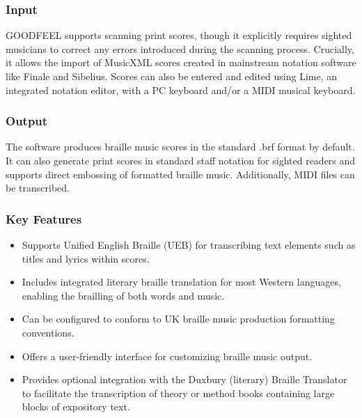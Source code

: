 \subsubsection{Input}
GOODFEEL supports scanning print scores, though it explicitly requires sighted musicians to correct any errors introduced during the scanning process. \cite{dancingdots-goodfeel} Crucially, it allows the import of MusicXML scores created in mainstream notation software like Finale and Sibelius. \cite{dancingdots-goodfeel} Scores can also be entered and edited using Lime, an integrated notation editor, with a PC keyboard and/or a MIDI musical keyboard. \cite{dancingdots-goodfeel, canasstech-limealoud, dancingdots-lime}

\subsubsection{Output}
The software produces braille music scores in the standard .brf format by default. \cite{dancingdots-goodfeel} It can also generate print scores in standard staff notation for sighted readers and supports direct embossing of formatted braille music. \cite{dancingdots-goodfeel} Additionally, MIDI files can be transcribed. \cite{dancingdots-goodfeel}

\subsubsection{Key Features}
\begin{itemize}
    \item Supports Unified English Braille (UEB) for transcribing text elements such as titles and lyrics within scores. \cite{dancingdots-goodfeel}
    \item Includes integrated literary braille translation for most Western languages, enabling the brailling of both words and music. \cite{dancingdots-goodfeel}
    \item Can be configured to conform to UK braille music production formatting conventions. \cite{dancingdots-goodfeel}
    \item Offers a user-friendly interface for customizing braille music output. \cite{dancingdots-goodfeel}
    \item Provides optional integration with the Duxbury (literary) Braille Translator to facilitate the transcription of theory or method books containing large blocks of expository text. \cite{dancingdots-goodfeel}
\end{itemize}

